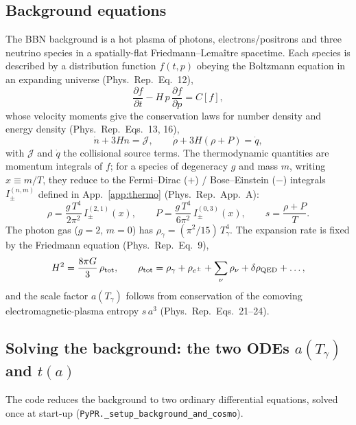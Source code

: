 \documentclass[11pt,a4paper]{article}
\newcommand{\Tg}{T_\gamma}
\newcommand{\code}[1]{\texttt{#1}}
\newcommand{\PR}{Phys.\ Rep.}
\begin{document}
\subsection{Background equations}
The BBN background is a hot plasma of photons, electrons/positrons and three
neutrino species in a spatially-flat Friedmann--Lema\^itre spacetime. Each
species is described by a distribution function $f(t,p)$ obeying the Boltzmann
equation in an expanding universe (\PR\ Eq.~12),
\begin{equation}
  \frac{\partial f}{\partial t} - H\,p\,\frac{\partial f}{\partial p}
  = C[f],
\end{equation}
whose velocity moments give the conservation laws for number density and energy
density (\PR\ Eqs.~13, 16),
\begin{equation}
  \dot n + 3 H n = \mathcal{J}, \qquad
  \dot\rho + 3H(\rho+P) = \dot q,
\label{eq:cons}
\end{equation}
with $\mathcal{J}$ and $\dot q$ the collisional source terms. The thermodynamic
quantities are momentum integrals of $f$; for a species of degeneracy $g$ and
mass $m$, writing $x\equiv m/T$, they reduce to the Fermi--Dirac ($+$) /
Bose--Einstein ($-$) integrals $I^{(n,m)}_\pm$ defined in
App.~\ref{app:thermo} (\PR\ App.~A):
\begin{equation}
  \rho = \frac{g\,T^4}{2\pi^2}\, I^{(2,1)}_\pm(x), \qquad
  P    = \frac{g\,T^4}{6\pi^2}\, I^{(0,3)}_\pm(x), \qquad
  s    = \frac{\rho+P}{T}.
\label{eq:thermo}
\end{equation}
The photon gas ($g=2$, $m=0$) has $\rho_\gamma = (\pi^2/15)\,\Tg^4$. The
expansion rate is fixed by the Friedmann equation (\PR\ Eq.~9),
\begin{equation}
  H^2 = \frac{8\pi G}{3}\,\rho_{\rm tot},
  \qquad
  \rho_{\rm tot} = \rho_\gamma + \rho_{e^\pm} + \sum_\nu \rho_\nu
                   + \delta\rho_{\rm QED} + \dots,
\label{eq:friedmann}
\end{equation}
and the scale factor $a(\Tg)$ follows from conservation of the comoving
electromagnetic-plasma entropy $s\,a^3$ (\PR\ Eqs.~21--24).

\subsection{Solving the background: the two ODEs $a(\Tg)$ and $t(a)$}
\label{sec:bckg-ode}
The code reduces the background to two ordinary differential equations, solved
once at start-up (\code{PyPR.\_setup\_background\_and\_cosmo}).
\end{document}
